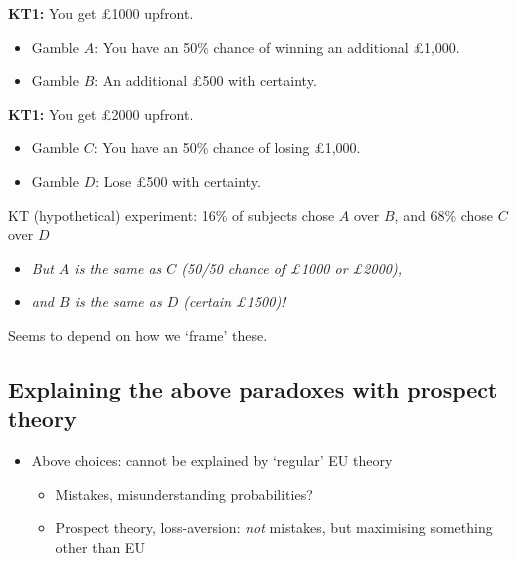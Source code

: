 \documentclass[]{article}
\providecommand{\tightlist}{%
  \setlength{\itemsep}{0pt}\setlength{\parskip}{0pt}}
\begin{document}
\hrulefill

\textbf{KT1:} You get \pounds1000 upfront.\\

\begin{itemize}
\item
  Gamble \(A\): You have an 50\% chance of winning an additional
  \pounds1,000.
\item
  Gamble \(B\): An additional \pounds500 with certainty.
\end{itemize}

\hrulefill

\textbf{KT1:} You get \pounds2000 upfront.\\

\begin{itemize}
\item
  Gamble \(C\): You have an 50\% chance of losing \pounds1,000.
\item
  Gamble \(D\): Lose \pounds500 with certainty.
\end{itemize}

\bigskip

\hrulefill

KT (hypothetical) experiment: 16\% of subjects chose \(A\) over \(B\),
and 68\% chose \(C\) over \(D\)

\begin{itemize}
\tightlist
\item
  \emph{But \(A\) is the same as \(C\) (50/50 chance of \pounds1000 or
  \pounds2000),}
\item
  \emph{and \(B\) is the same as \(D\) (certain \pounds1500)!}
\end{itemize}

Seems to depend on how we `frame' these.

\hypertarget{explaining-the-above-paradoxes-with-prospect-theory}{%
\subsection{Explaining the above paradoxes with prospect
theory}\label{explaining-the-above-paradoxes-with-prospect-theory}}

\begin{itemize}
\tightlist
\item
  Above choices: cannot be explained by `regular' EU theory

  \begin{itemize}
  \tightlist
  \item
    Mistakes, misunderstanding probabilities?
  \item
    Prospect theory, loss-aversion: \emph{not} mistakes, but maximising
    something other than EU
  \end{itemize}
\end{itemize}
\end{document}
